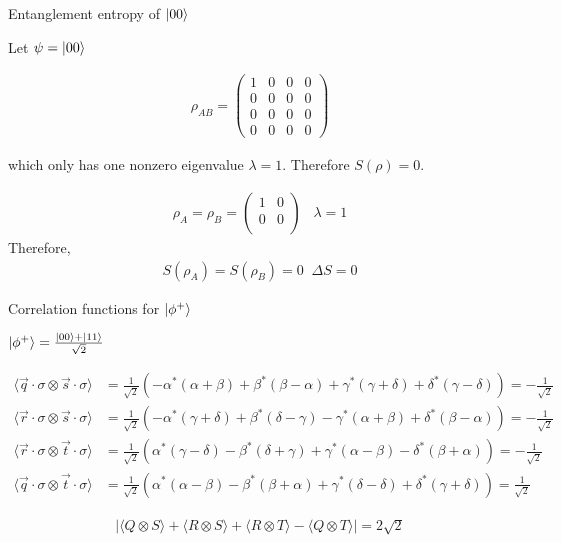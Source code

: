 \documentclass[aspectratio=1610]{beamer}					%
\begin{document}
\begin{frame}{Entanglement entropy of $\ket{00}$}

Let $\psi = \ket{00}$

\begin{align*}
\rho_{AB} = 
\begin{pmatrix}
1 & 0 & 0 & 0 \\
0 & 0 & 0 & 0 \\
0 & 0 & 0 & 0 \\
0 & 0 & 0 & 0
\end{pmatrix}
\end{align*}

which only has one nonzero eigenvalue $\lambda = 1$. Therefore $S(\rho) = 0$.

\begin{align*}
\rho_{A} = \rho_{B} = \begin{pmatrix}
1 & 0\\
0 & 0\\
\end{pmatrix}
\;\;\; \lambda = 1
\end{align*}
Therefore,
\begin{align*}
S(\rho_{A}) = S(\rho_{B}) = 0  \;\; \Delta S = 0
\end{align*}

\end{frame}

\begin{frame}{Correlation functions for $\ket{\phi^{+}}$}

$\ket{\phi^{+}} = \frac{\ket{00} + \ket{11}}{\sqrt{2}}$

\begin{align*}
\langle \vec{q}\cdot\sigma\otimes\vec{s}\cdot\sigma\rangle &= \frac{1}{\sqrt{2}}\left(-\alpha^{*}(\alpha+\beta) + \beta^{*}(\beta-\alpha) + \gamma^{*}(\gamma+\delta) + \delta^{*}(\gamma-\delta)\right) = -\frac{1}{\sqrt{2}}\\
\langle \vec{r}\cdot\sigma\otimes\vec{s}\cdot\sigma\rangle &= \frac{1}{\sqrt{2}}\left(-\alpha^{*}(\gamma+\delta) + \beta^{*}(\delta-\gamma) - \gamma^{*}(\alpha + \beta) + \delta^{*}(\beta-\alpha)\right)= -\frac{1}{\sqrt{2}}\\
\langle \vec{r}\cdot\sigma\otimes\vec{t}\cdot\sigma\rangle &= \frac{1}{\sqrt{2}}\left(\alpha^{*}(\gamma-\delta) - \beta^{*}(\delta+\gamma) + \gamma^{*}(\alpha - \beta) - \delta^{*}(\beta+\alpha)\right)= -\frac{1}{\sqrt{2}}\\
\langle \vec{q}\cdot\sigma\otimes\vec{t}\cdot\sigma\rangle &= \frac{1}{\sqrt{2}}\left(\alpha^{*}(\alpha-\beta) - \beta^{*}(\beta+\alpha) + \gamma^{*}(\delta-\delta) + \delta^{*}(\gamma+\delta)\right)= \frac{1}{\sqrt{2}}
\end{align*}

\begin{align*}
|\langle Q\otimes S\rangle + \langle R\otimes S\rangle  + \langle R\otimes T\rangle  - \langle Q\otimes T\rangle|  = 2\sqrt{2}
\end{align*}


\end{frame}
\end{document}
